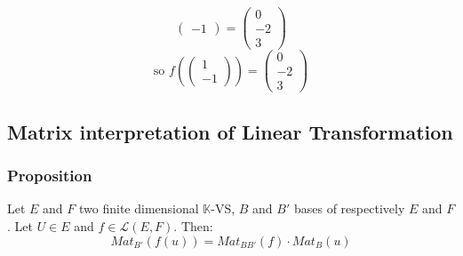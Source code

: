 \documentclass[notitlepage]{math}
\begin{document}
\begin{enumerate}[label=\protect\circled{\arabic*}]
\[\begin{pmatrix}
        -1 
    \end{pmatrix} = \begin{pmatrix}
        0 \\
        -2 \\
        3
    \end{pmatrix}\]
    \[ \text{so } f \left(\begin{pmatrix} 1 \\ -1 \end{pmatrix}\right) = \begin{pmatrix} 0 \\ -2 \\ 3 \end{pmatrix}\]
\end{enumerate}
\subsection{Matrix interpretation of Linear Transformation}
\subsubsection{Proposition}
Let $E$ and $F$ two finite dimensional $\mathbb{K}$-VS, $B$ and $B'$ bases of respectively $E$ and $F$. Let $U \in E$ and $f \in \mathcal{L}(E,F)$.
Then:
\[ Mat_{B'}(f(u)) = Mat_{BB'}(f) \cdot Mat_{B}(u)\]
\end{document}
